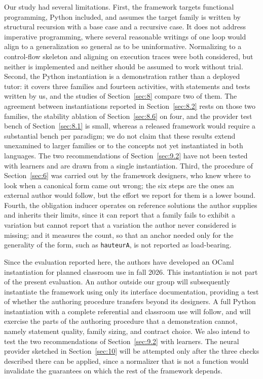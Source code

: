 \documentclass[journal]{IEEEtran}
\begin{document}
Our study had several limitations. First, the framework targets
functional programming, Python included, and assumes the target family
is written by structural recursion with a base case and a recursive
case. It does not address imperative programming, where several
reasonable writings of one loop would align to a generalization so
general as to be uninformative. Normalizing to a control-flow skeleton
and aligning on execution traces were both considered, but neither is
implemented and neither should be assumed to work without trial. Second,
the Python instantiation is a demonstration rather than a deployed
tutor: it covers three families and fourteen activities, with statements
and tests written by us, and the studies of Section~\ref{sec:8} compare two of
them. The agreement between instantiations reported in Section~\ref{sec:8.2} rests
on those two families, the stability ablation of Section~\ref{sec:8.6} on four,
and the provider test bench of Section~\ref{sec:8.1} is small, whereas a released
framework would require a substantial bench per paradigm; we do not claim
that these results extend unexamined to larger families or to the
concepts not yet instantiated in both languages. The two recommendations
of Section~\ref{sec:9.2} have not been tested with learners and are drawn from a
single instantiation.
Third, the procedure of Section~\ref{sec:6} was carried out by the framework
designers, who knew where to look when a canonical form came out wrong;
the six steps are the ones an external author would follow, but the
effort we report for them is a lower bound. Fourth, the obligation inducer
operates on reference solutions the author supplies and inherits their
limits, since it can report that a family fails to exhibit a variation
but cannot report that a variation the author never considered is
missing; and it measures the count, so that an anchor needed only for the
generality of the form, such as \texttt{hauteurA}, is not reported as
load-bearing.

Since the evaluation reported here, the authors have developed an OCaml
instantiation for planned classroom use in fall 2026. This instantiation
is not part of the present evaluation. An author outside our group will
subsequently instantiate the framework using only its interface
documentation, providing a test of whether the authoring procedure
transfers beyond its designers. A full Python instantiation with a complete referential and
classroom use will follow, and will exercise the parts of the authoring
procedure that a demonstration cannot, namely statement quality, family
sizing, and contract choice. We also intend to test the two
recommendations of Section~\ref{sec:9.2} with learners. The neural provider sketched in
Section~\ref{sec:10} will be attempted only after the three checks described there
can be applied, since a normalizer that is not a function would
invalidate the guarantees on which the rest of the framework depends.
\end{document}
